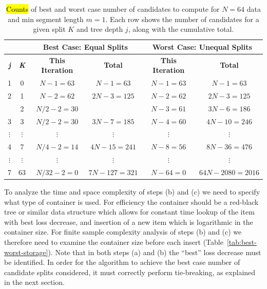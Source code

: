 \documentclass[algorithms,article,accept,oneauthor]{Definitions/mdpi}
\begin{document}
\begin{table}[H]
    \caption{\hl{Counts} %
 of best and worst case number of candidates to compute for $N=64$ data and min segment length $m=1$.
    Each row shows the number of candidates for a given split $K$ and tree depth $j$, along with the cumulative total.}
    \label{tab:best-worst-time}\setlength{\tabcolsep}{3mm} 
\begin{tabularx}{\textwidth}{cccccc}
\toprule
&& \multicolumn{2}{c}{\textbf{Best Case: Equal Splits}} &
\multicolumn{2}{c}{\textbf{Worst Case: Unequal Splits}} \\
\midrule
\textbf{\textit{j}} & \textbf{\textit{K}} & \textbf{This Iteration} & \textbf{Total} & \textbf{This Iteration} & \textbf{Total} \\
\midrule
1 & 0 & $N-1=63$  & $N-1=63$    & $N-1=63$ & $N-1=63$ \\
2 & 1 & $N-2=62$  & $2N-3=125$  & $N-2=62$ & $2N-3=125$ \\
  & 2 & $N/2-2=30$&             & $N-3=61$ & $3N-6=186$ \\
3 & 3 & $N/2-2=30$& $3N-7=185$  & $N-4=60$ & $4N-10=246$ \\
$\vdots$ &     $\vdots$ &     $\vdots$  & $\vdots$ & $\vdots$ & $\vdots$\\
4 & 7 & $N/4-2=14$& $4N-15=241$ & $N-8=56$ & $8N-36=476$ \\
$\vdots$ &     $\vdots$ &     $\vdots$  & $\vdots$ & $\vdots$ & $\vdots$ \\
7 & 63 & $N/32-2=0$&$7N-127=321$ & $N-64=0$ & $64N-2080=2016$ \\\bottomrule
\end{tabularx}
\end{table}

To analyze the time and space complexity of steps (b) and (c) we need to specify what type of container is used. 
For efficiency the container should be a red-black tree or similar data structure which allows for constant time lookup of the item with best loss decrease, and insertion of a new item which is logarithmic in the container size.
For finite sample complexity analysis of steps (b) and (c) we therefore need to examine the container size before each insert (Table~\ref{tab:best-worst-storage}).
Note that in both steps (a) and (b) the ``best'' loss decrease must be identified.
In order for the algorithm to achieve the best case number of candidate splits considered, it must correctly perform tie-breaking, as explained in the next section.
\end{document}
